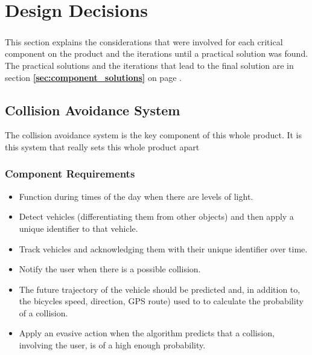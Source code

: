 \documentclass[a4paper]{report}
\begin{document}
\chapter{Design Decisions}

\paragraph{}This section explains the considerations that were involved for each critical component on the product and the iterations until a practical solution was found. The practical solutions and the iterations that lead to the final solution are in section \textbf{\ref{sec:component_solutions} } on page \textbf{\pageref{sec:component_solutions}}. 

\section{Collision Avoidance System}
The collision avoidance system is the key component of this whole product. It is this system that really sets this whole product apart
\subsection{Component Requirements}
\begin{itemize}
  \item Function during times of the day when there are levels of light.
  \item Detect vehicles (differentiating them from other objects) and then apply a unique identifier to that vehicle.
  \item Track vehicles and acknowledging them with their unique identifier over time.
  \item Notify the user when there is a possible collision.
  \item The future trajectory of the vehicle should be predicted and, in addition to, the bicycles speed, direction, GPS route) used to to calculate the probability of a collision.
  \item Apply an evasive action when the algorithm predicts that a collision, involving the user, is of a high enough probability. 
\end{itemize}

\paragraph{}
\end{document}
